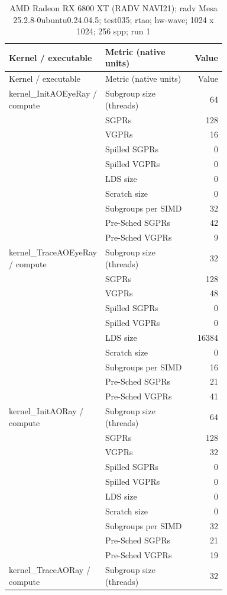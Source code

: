\begin{longtable}{p{0.30\linewidth}p{0.43\linewidth}r}
\caption{AMD Radeon RX 6800 XT (RADV NAVI21); radv Mesa 25.2.8-0ubuntu0.24.04.5; test035; rtao; hw-wave; 1024 x 1024; 256 spp; run 1}\label{tab:hydra-profile-27}\\
\hline Kernel / executable & Metric (native units) & Value \\\hline
\endfirsthead
\hline Kernel / executable & Metric (native units) & Value \\\hline
\endhead
kernel\_InitAOEyeRay / compute & Subgroup size (threads) & 64 \\
 & SGPRs & 128 \\
 & VGPRs & 16 \\
 & Spilled SGPRs & 0 \\
 & Spilled VGPRs & 0 \\
 & LDS size & 0 \\
 & Scratch size & 0 \\
 & Subgroups per SIMD & 32 \\
 & Pre-Sched SGPRs & 42 \\
 & Pre-Sched VGPRs & 9 \\
\hline
kernel\_TraceAOEyeRay / compute & Subgroup size (threads) & 32 \\
 & SGPRs & 128 \\
 & VGPRs & 48 \\
 & Spilled SGPRs & 0 \\
 & Spilled VGPRs & 0 \\
 & LDS size & 16384 \\
 & Scratch size & 0 \\
 & Subgroups per SIMD & 16 \\
 & Pre-Sched SGPRs & 21 \\
 & Pre-Sched VGPRs & 41 \\
\hline
kernel\_InitAORay / compute & Subgroup size (threads) & 64 \\
 & SGPRs & 128 \\
 & VGPRs & 32 \\
 & Spilled SGPRs & 0 \\
 & Spilled VGPRs & 0 \\
 & LDS size & 0 \\
 & Scratch size & 0 \\
 & Subgroups per SIMD & 32 \\
 & Pre-Sched SGPRs & 21 \\
 & Pre-Sched VGPRs & 19 \\
\hline
kernel\_TraceAORay / compute & Subgroup size (threads) & 32 \\

\end{longtable}

